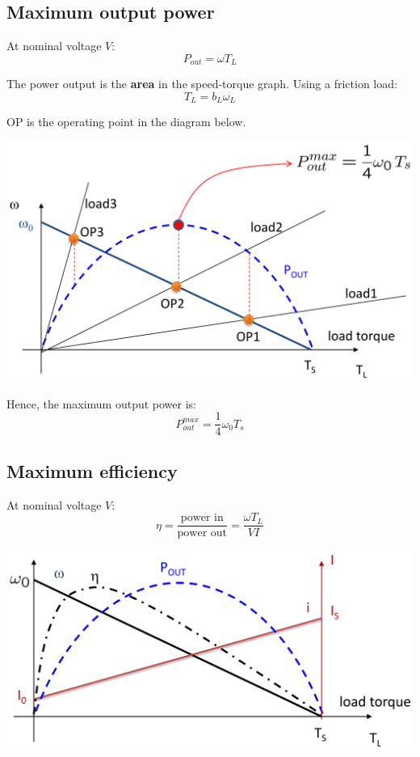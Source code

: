 \documentclass[11pt]{article}
\begin{document}
 \newpage
\subsection{Maximum output power}
\label{sec:org661da19}
At nominal voltage \(V\):
\[P_{out} = \omega T_L\]

The power output is the \textbf{area} in the speed-torque graph. Using a friction load:
\[T_L = b_L \omega_L\]

OP is the operating point in the diagram below.

\begin{center}
\includegraphics[width=.9\linewidth]{./images/dc-motor-maximum-output-power-graph.png}
\end{center}

Hence, the maximum output power is:
\[P_{out}^{max} = \frac{1}{4} \omega_0 T_s\]

 \newpage
\subsection{Maximum efficiency}
\label{sec:org402499f}
At nominal voltage \(V\):
\[\eta = \frac{\text{power in}}{\text{power out}} = \frac{\omega T_L}{VI}\]

\begin{center}
\includegraphics[width=.9\linewidth]{./images/dc-motor-maximum-efficiency-graph.png}
\end{center}
\end{document}
